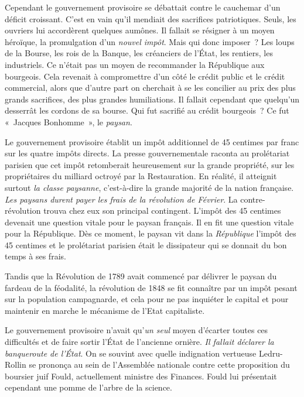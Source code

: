 \documentclass[twoside]{book} %
\begin{document}
Cependant le gouvernement provisoire se débattait contre le cauchemar d’un déficit croissant. C’est en vain qu’il mendiait des sacrifices patriotiques. Seuls, les ouvriers lui accordèrent quelques aumônes. Il fallait se résigner à un moyen héroïque, la promulgation d’un \emph{nouvel impôt}. Mais qui donc imposer ? Les loups de la Bourse, les rois de la Banque, les créanciers de l’État, les rentiers, les industriels. Ce n’était pas un moyen de recommander la République aux bourgeois. Cela revenait à compromettre d’un côté le crédit public et le crédit commercial, alors que d’autre part on cherchait à se les concilier au prix des plus grands sacrifices, des plus grandes humiliations. Il fallait cependant que quelqu’un desserrât les cordons de sa bourse. Qui fut sacrifié au crédit bourgeois ? Ce fut « Jacques Bonhomme », le \emph{paysan}.\par
Le gouvernement provisoire établit un impôt additionnel de 45 centimes par franc sur les quatre impôts directs. La presse gouvernementale raconta au prolétariat parisien que cet impôt retomberait heureusement sur la grande propriété, sur les propriétaires du milliard octroyé par la Restauration. En réalité, il atteignit surtout \emph{la classe paysanne}, c’est-à-dire la grande majorité de la nation française. \emph{Les paysans durent payer les frais de la révolution de Février}. La contre-révolution trouva chez eux son principal contingent. L’impôt des 45 centimes devenait une question vitale pour le paysan français. Il en fit une question vitale pour la République. Dès ce moment, le paysan vit dans la \emph{République} l’impôt des 45 centimes et le prolétariat parisien était le dissipateur qui se donnait du bon temps à ses frais.\par
Tandis que la Révolution de 1789 avait commencé par délivrer le paysan du fardeau de la féodalité, la révolution de 1848 se fit connaître par un impôt pesant sur la population campagnarde, et cela pour ne pas inquiéter le capital et pour maintenir en marche le mécanisme de l’Etat capitaliste.\par
Le gouvernement provisoire n’avait qu’\emph{un seul} moyen d’écarter toutes ces difficultés et de faire sortir l’État de l’ancienne ornière. \emph{Il fallait déclarer la banqueroute de l’État}. On se souvint avec quelle indignation vertueuse Ledru-Rollin se prononça au sein de l’Assemblée nationale contre cette proposition du boursier juif Fould, actuellement ministre des Finances. Fould lui présentait cependant une pomme de l’arbre de la science.\par
\end{document}
